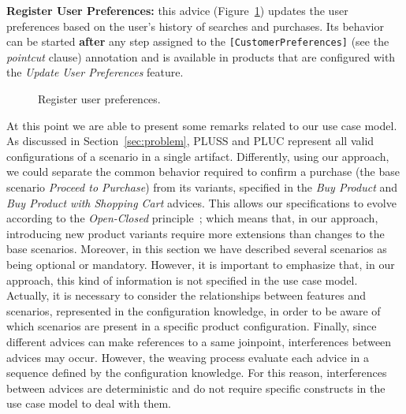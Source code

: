 {\bf Register User Preferences:} this advice
(Figure~\ref{fig:register-preferences-flow}) updates the user preferences based
on the user's history of searches and purchases. Its behavior can be started {\bf
after} any step assigned to the \texttt{[CustomerPreferences]} (see the
\emph{pointcut} clause) annotation and is available in products that are
configured with the \emph{Update User Preferences} feature.

\begin{figure}[h]
\caption{Register user preferences.}
\label{fig:register-preferences-flow}
\end{figure}

{\color{red} At this point we are able to present some remarks related to our use
case model. As discussed in Section~\ref{sec:problem}, PLUSS and PLUC represent
all valid configurations of a scenario in a single artifact. Differently, using
our approach, we could separate the common behavior required to confirm a
purchase (the base scenario \emph{Proceed to Purchase}) from its variants,
specified in the \emph{Buy Product} and \emph{Buy Product with Shopping Cart}
advices. {\color{blue}This allows our specifications to evolve according to the
\emph{Open-Closed} principle~\cite{Meyer:2000aa}; which means that, in our
approach, introducing new product variants require more extensions than changes
to the base scenarios.} Moreover, in this section we have described several
scenarios as being optional or mandatory. However, it is important to emphasize
that, in our approach, this kind of information is not specified in the use case
model. Actually, it is necessary to consider the relationships between features
and scenarios, represented in the configuration knowledge, in order to be aware
of which scenarios are present in a specific product configuration. Finally,
since different advices can make references to a same joinpoint,  interferences
between advices may occur. However, the weaving process evaluate each advice in
a sequence defined by the configuration knowledge. For this reason, interferences
between advices are deterministic and do not require specific constructs in the
use case model to deal with them.}

